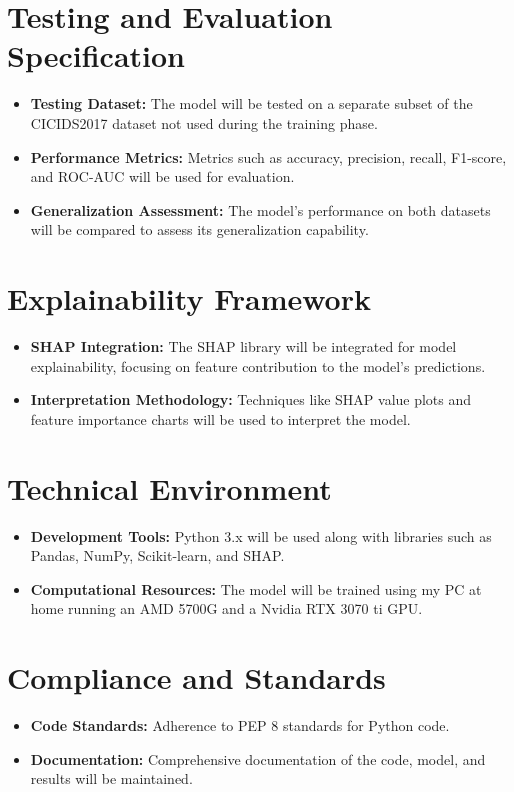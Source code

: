 \section{Testing and Evaluation Specification}
\begin{itemize}
    \item \textbf{Testing Dataset:} The model will be tested on a separate subset of the CICIDS2017 dataset not used during the training phase.
    \item \textbf{Performance Metrics:} Metrics such as accuracy, precision, recall, F1-score, and ROC-AUC will be used for evaluation.
    \item \textbf{Generalization Assessment:} The model's performance on both datasets will be compared to assess its generalization capability.
\end{itemize}

\section{Explainability Framework}
\begin{itemize}
    \item \textbf{SHAP Integration:} The SHAP library will be integrated for model explainability, focusing on feature contribution to the model's predictions.
    \item \textbf{Interpretation Methodology:} Techniques like SHAP value plots and feature importance charts will be used to interpret the model.
\end{itemize}

\section{Technical Environment}
\begin{itemize}
    \item \textbf{Development Tools:} Python 3.x will be used along with libraries such as Pandas, NumPy, Scikit-learn, and SHAP.
    \item \textbf{Computational Resources:} The model will be trained using my PC at home running an AMD 5700G and a Nvidia RTX 3070 ti GPU.
\end{itemize}

\section{Compliance and Standards}
\begin{itemize}
    \item \textbf{Code Standards:} Adherence to PEP 8 standards for Python code.
    \item \textbf{Documentation:} Comprehensive documentation of the code, model, and results will be maintained.
\end{itemize}


